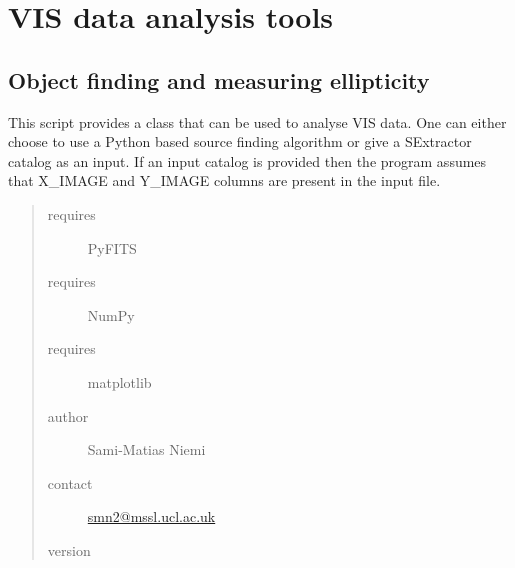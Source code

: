 \documentclass[a4paper,11pt,english]{sphinxmanual}
\begin{document}
\section{VIS data analysis tools}
\label{analysis::doc}\label{analysis:module-analysis.analyse}\label{analysis:vis-data-analysis-tools}

\subsection{Object finding and measuring ellipticity}
\label{analysis:object-finding-and-measuring-ellipticity}
This script provides a class that can be used to analyse VIS data.
One can either choose to use a Python based source finding algorithm or
give a SExtractor catalog as an input. If an input catalog is provided
then the program assumes that X\_IMAGE and Y\_IMAGE columns are present
in the input file.
\begin{quote}\begin{description}
\item[{requires}] \leavevmode
PyFITS

\item[{requires}] \leavevmode
NumPy

\item[{requires}] \leavevmode
matplotlib

\item[{author}] \leavevmode
Sami-Matias Niemi

\item[{contact}] \leavevmode
\href{mailto:smn2@mssl.ucl.ac.uk}{smn2@mssl.ucl.ac.uk}

\item[{version}] 

\end{description}\end{quote}
\end{document}
